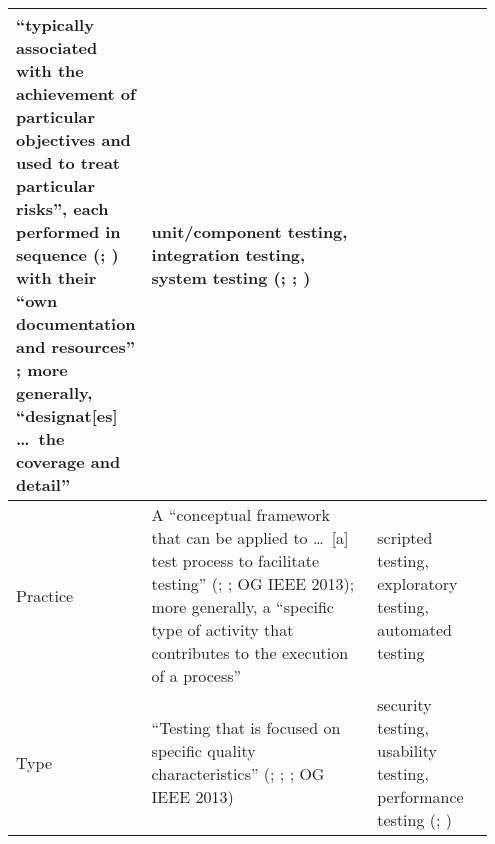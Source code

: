 \begin{table}[hbtp!]
\begin{minipage}{\linewidth}
\begin{tabular}{|>{\centering}m{0.08\linewidth}m{0.6\linewidth}m{0.27\linewidth}|}
                  ``typically associated with the achievement of particular objectives
                  and used to treat particular risks'', each performed in sequence
                  (\citealp[p.~12]{IEEE2022}; \citeyear[p.~6]{IEEE2021}) with their
                  ``own documentation and resources'' \citeyearpar[p.~469]{IEEE2017};
                  more generally, ``designat[es] \dots\ the coverage and detail''
                  \citeyearpar[p.~249]{IEEE2017}          & unit/component testing,
                  integration testing, system testing (\citealp[p.~12]{IEEE2022};
                  \citeyear[p.~6]{IEEE2021}; \citeyear[p.~467]{IEEE2017})                                              \\
                  \hline
                  Practice                                & A ``conceptual framework
                  that can be applied to \dots\ [a] test process to facilitate testing''
                  (\citealp[p.~14]{IEEE2022}; \citeyear[p.~471]{IEEE2017}; OG IEEE 2013);
                  more generally, a ``specific type of activity
                  that contributes to the execution of a process''
                  \citeyearpar[p.~331]{IEEE2017}          & scripted testing,
                  exploratory testing, automated testing \citep[p.~20]{IEEE2022}                                       \\
                  \hline
                  Type                                    & ``Testing that is focused
                  on specific quality characteristics'' (\citealp[p.~15]{IEEE2022};
                  \citeyear[p.~7]{IEEE2021}; \citeyear[p.~473]{IEEE2017};
                  OG IEEE 2013)                           & security testing, usability testing,
                  performance testing (\citealp[p.~15]{IEEE2022};
                  \citeyear[p.~473]{IEEE2017})                                                                         \\
                  \hline
            \end{tabular}
      \end{minipage}
\end{table}
